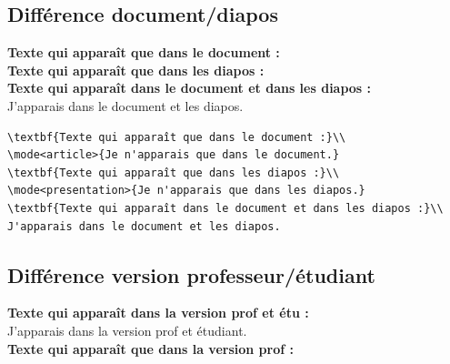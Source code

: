 \documentclass[b,e,cours]{D:/Dropbox/enseignement/CPGE/raphaelpoiree/paquets/classe_kara}
\begin{document}
\subsection{Différence document/diapos}
\begin{frame}[fragile]
\textbf{Texte qui apparaît que dans le document :}\\
\textbf{Texte qui apparaît que dans les diapos :}\\
\textbf{Texte qui apparaît dans le document et dans les diapos :}\\
J'apparais dans le document et les diapos.

\begin{verbatim}
\textbf{Texte qui apparaît que dans le document :}\\
\mode<article>{Je n'apparais que dans le document.}
\textbf{Texte qui apparaît que dans les diapos :}\\
\mode<presentation>{Je n'apparais que dans les diapos.}
\textbf{Texte qui apparaît dans le document et dans les diapos :}\\
J'apparais dans le document et les diapos.
\end{verbatim}
\end{frame}


\subsection{Différence version professeur/étudiant}

\begin{frame}
\textbf{Texte qui apparaît dans la version prof et étu :}\\
J'apparais dans la version prof et étudiant.\\

\textbf{Texte qui apparaît que dans la version prof :}\\
%
\end{frame}

%
%
\end{document}
